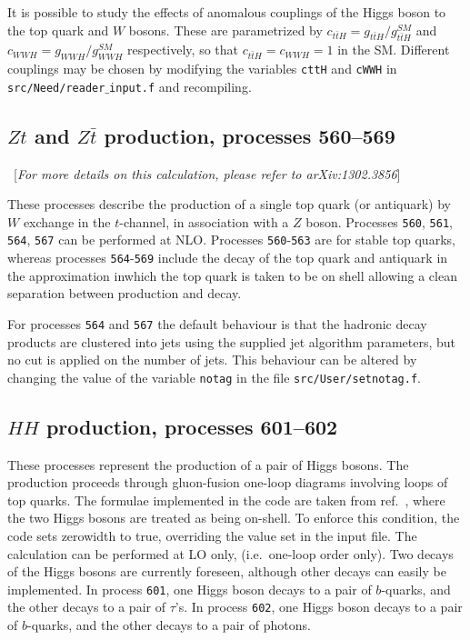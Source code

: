 \documentclass[12pt]{article}
\begin{document}
It is possible to study the effects of anomalous couplings of the Higgs boson to the top quark and $W$ bosons. These are parametrized by $c_{t\bar{t}H} = g_{t\bar{t}H}/g_{t\bar{t}H}^{SM}$ and $c_{WWH} = g_{WWH}/g_{WWH}^{SM}$ respectively, so that $c_{t\bar{t}H}=c_{WWH}=1$ in the SM. Different couplings may be chosen by modifying the variables {\tt cttH} and {\tt cWWH} in {\tt src/Need/reader$\_$input.f} and recompiling.

\subsection{$Zt$ and $Z\bar{t}$ production, processes 560--569}\
[{\it For more details on this calculation, please refer to arXiv:1302.3856}]

\label{subsec:Zt}
These processes describe the production of a single top quark (or antiquark) by $W$ exchange in the
$t$-channel, in association with a $Z$ boson. Processes {\tt 560}, {\tt 561},
{\tt 564}, {\tt 567} can be performed at NLO.
Processes {\tt  560}-{\tt 563} are for stable top quarks, whereas processes {\tt 564}-{\tt 569}
include the decay of the top quark and antiquark
in the approximation inwhich the top quark is taken to
be on shell allowing a clean separation
between production and decay.

For processes {\tt 564} and {\tt 567} the default behaviour is that the hadronic decay products
are clustered into jets using the supplied jet
algorithm parameters, but no cut is applied on the number of jets.
This behaviour can be altered by changing the value of the
variable {\tt notag} in the file {\tt src/User/setnotag.f}.

\subsection{$HH$ production, processes 601--602}
These processes represent the production of a pair of Higgs bosons.
The production proceeds through gluon-fusion one-loop diagrams involving loops 
of top quarks. The formulae implemented in the code are taken from ref.~\cite{Glover:1987nx},
where the two Higgs bosons are treated as being on-shell. To enforce this 
condition, the code sets zerowidth to true, overriding the value set in the input file.
The calculation can be performed at LO only, (i.e.\ one-loop order only).
Two decays of the Higgs bosons are currently foreseen, although other decays can easily be implemented. 
In process {\tt 601}, one Higgs boson decays to
a pair of $b$-quarks, and the other decays to a pair of $\tau$'s.
In process {\tt 602}, one Higgs boson decays to
a pair of $b$-quarks, and the other decays to a pair of photons.
\end{document}
